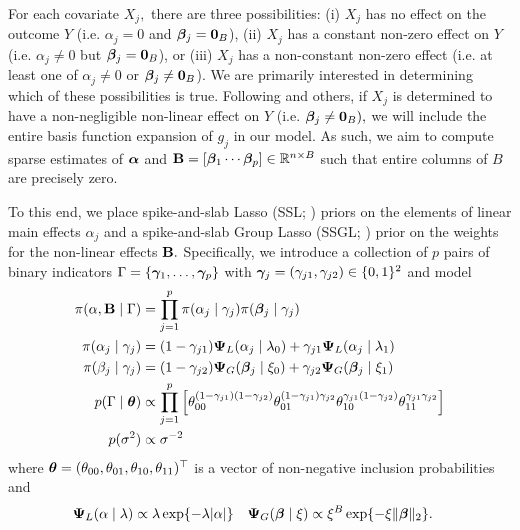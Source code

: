For each covariate $X_{j},$ there are three possibilities: (i) $X_{j}$ has no effect on the outcome $Y$ (i.e. $\alpha_{j} = 0$ and $\boldsymbol{\beta}_{j} = \mathbf{0}_{B}$), (ii) $X_{j}$ has a constant non-zero effect on $Y$ (i.e. $\alpha_{j} \neq 0$ but $\boldsymbol{\beta}_{j} = \mathbf{0}_{B}$), or (iii) $X_{j}$ has a non-constant non-zero effect (i.e. at least one of $\alpha_{j} \neq 0$ or $\boldsymbol{\beta}_{j} \neq \mathbf{0}_{B}$). 
We are primarily interested in determining which of these possibilities is true. 
Following \citet{Bai2020} and others, if $X_{j}$ is determined to have a non-negligible non-linear effect on $Y$ (i.e. $\boldsymbol{\beta}_{j} \neq \mathbf{0}_{B}),$ we will include the entire basis function expansion of $g_{j}$ in our model.
As such, we aim to compute sparse estimates of $\boldsymbol{\alpha}$ and $\mathbf{B} = [\boldsymbol{\beta}_{1} \cdots \boldsymbol{\beta}_{p}] \in \mathbb{R}^{n \times B}$ such that entire columns of $B$ are precisely zero.  

To this end, we place spike-and-slab Lasso (SSL; \citet{RockovaGeorge2018}) priors on the elements of linear main effects $\alpha_{j}$ and a spike-and-slab Group Lasso (SSGL; \citet{Bai2020}) prior on the weights for the non-linear effects $\mathbf{B}.$
Specifically, we introduce a collection of $p$ pairs of binary indicators $\Gamma = \{\boldsymbol{\gamma}_{1}, \ldots, \boldsymbol{\gamma}_{p}\}$ with $\boldsymbol{\gamma}_{j} = (\gamma_{j1}, \gamma_{j2}) \in \{0,1\}^{2}$ and model
\begin{align*}
\pi(\alpha, \mathbf{B} \mid \Gamma) &= \prod_{j = 1}^{p}{\pi(\alpha_{j} \mid \gamma_{j})\pi(\boldsymbol{\beta}_{j} \mid \gamma_{j})} \\
\pi(\alpha_{j} \mid \gamma_{j}) &= (1 - \gamma_{j1})\boldsymbol{\Psi}_{L}(\alpha_{j} \mid \lambda_{0}) + \gamma_{j1}\boldsymbol{\Psi}_{L}(\alpha_{j} \mid \lambda_{1}) \\
\pi(\beta_{j} \mid \gamma_{j}) &= (1 - \gamma_{j2})\boldsymbol{\Psi}_{G}(\boldsymbol{\beta}_{j} \mid \xi_{0}) + \gamma_{j2}\boldsymbol{\Psi}_{G}(\boldsymbol{\beta}_{j} \mid \xi_{1})\\
p(\Gamma \mid \boldsymbol{\theta}) &\propto \prod_{j = 1}^{p}{\left[\theta_{00}^{(1 - \gamma_{j1})(1 - \gamma_{j2})}\theta_{01}^{(1 - \gamma_{j1})\gamma_{j2}}\theta_{10}^{\gamma_{j1}(1 - \gamma_{j2})}\theta_{11}^{\gamma_{j1}\gamma_{j2}}\right]} \\
p(\sigma^{2}) &\propto \sigma^{-2}
\end{align*}
where $\boldsymbol{\theta} = (\theta_{00}, \theta_{01}, \theta_{10}, \theta_{11})^{\top}$ is a vector of non-negative inclusion probabilities and
\begin{align*}
\boldsymbol{\Psi}_{L}(\alpha \mid \lambda) &\propto \lambda\exp\{-\lambda\lvert\alpha\rvert\} & \boldsymbol{\Psi}_{G}(\boldsymbol{\beta} \mid \xi) &\propto \xi^{B}\exp\{-\xi\lVert \boldsymbol{\beta} \rVert_{2}\}.
\end{align*}



